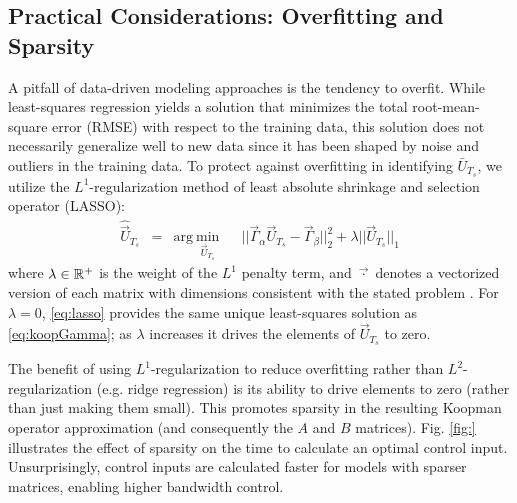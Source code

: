 \subsection{Practical Considerations: Overfitting and Sparsity}

A pitfall of data-driven modeling approaches is the tendency to overfit.
While least-squares regression yields a solution that minimizes the total root-mean-square error (RMSE) with respect to the training data, this solution does not necessarily generalize well to new data since it has been shaped by noise and outliers in the training data.
To protect against overfitting in identifying $\bar{U}_{T_s}$, we utilize the $L^1$-regularization method of least absolute shrinkage and selection operator (LASSO):
\begin{equation}
\begin{aligned}
\hat{\vec{U}}_{T_s} &= 
& \text{arg}~\underset{ \vec{U}_{T_s} }{\text{min}}
& & || \vec{\Gamma}_\alpha \vec{U}_{T_s} - \vec{\Gamma}_\beta ||_2^2 + \lambda || \vec{U}_{T_s} ||_1
\label{eq:lasso}
\end{aligned}
\end{equation}
where $\lambda \in \mathbb{R}^{+}$ is the weight of the $L^1$ penalty term, and $\vec{\cdot}$ denotes a vectorized version of each matrix with dimensions consistent with the stated problem \cite{tibshirani1996regression}.
For $\lambda = 0$, \eqref{eq:lasso} provides the same unique least-squares solution as \eqref{eq:koopGamma}; as $\lambda$ increases it drives the elements of $\vec{U}_{T_s}$ to zero.

The benefit of using $L^1$-regularization to reduce overfitting rather than $L^2$-regularization (e.g. ridge regression) is its ability to drive elements to zero (rather than just making them small).
This promotes sparsity in the resulting Koopman operator approximation (and consequently the $A$ and $B$ matrices).
Fig. \ref{fig:} illustrates the effect of sparsity on the time to calculate an optimal control input.
Unsurprisingly, control inputs are calculated faster for models with sparser matrices, enabling higher bandwidth control.

